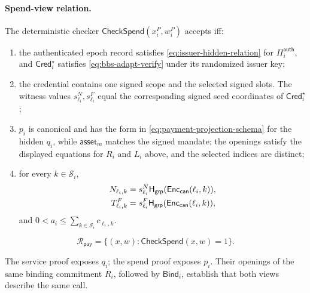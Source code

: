 \documentclass[letterpaper]{article}
\newcommand{\hashG}{\mathsf{H}_{\mathsf{grp}}}
\begin{document}
\paragraph{Spend-view relation.}
The deterministic checker \(\mathsf{CheckSpend}(x_i^P,w_i^P)\) accepts iff:
\begin{enumerate}
  \setlength{\itemsep}{0.15em}
  \setlength{\topsep}{0.25em}
  \item the authenticated epoch record satisfies
        \cref{eq:issuer-hidden-relation} for
        \(\Pi_i^{\mathsf{auth}}\), and \(\mathsf{Cred}_i^\star\) satisfies
        \cref{eq:bbs-adapt-verify} under its randomized issuer key;
  \item the credential contains one signed scope and the selected signed
        slots.  The witness values \(s^N_{\ell_i},s^F_{\ell_i}\) equal the
        corresponding signed seed coordinates of \(\mathsf{Cred}_i^\star\);
  \item \(p_i\) is canonical and has the form in
        \cref{eq:payment-projection-schema} for the hidden \(q_i\), while
        \(\mathsf{asset}_m\) matches the signed mandate; the openings satisfy the
        displayed equations for \(R_i\) and \(L_i\) above, and the selected
        indices are distinct;
  \item for every \(k\in\mathcal S_i\),
        \[
\ifdefined\MMAAAITwoColumn
        \begin{aligned}
        N_{\ell_i,k}&=s^N_{\ell_i}\hashG(
          \mathsf{Enc}_{\mathsf{can}}(\ell_i,k)),\\
        T^F_{\ell_i,k}&=s^F_{\ell_i}\hashG(
          \mathsf{Enc}_{\mathsf{can}}(\ell_i,k)),
        \end{aligned}
\else
        N_{\ell_i,k}=s^N_{\ell_i}\hashG(
          \mathsf{Enc}_{\mathsf{can}}(\ell_i,k)),
        \qquad
        T^F_{\ell_i,k}=s^F_{\ell_i}\hashG(
          \mathsf{Enc}_{\mathsf{can}}(\ell_i,k)),
\fi
        \]
        and \(0<a_i\le
        \sum_{k\in\mathcal S_i}c_{\ell_i,k}\).
\end{enumerate}
\begin{equation}
  \mathcal R_{\mathsf{pay}}
  =\{(x,w):\mathsf{CheckSpend}(x,w)=1\}.
\label{eq:redemption-relation}
\end{equation}

The service proof exposes \(q_i\); the spend proof exposes \(p_i\).  Their
openings of the same binding commitment \(R_i\), followed by
\(\mathsf{Bind}_i\), establish that both views describe the same call.
\end{document}
